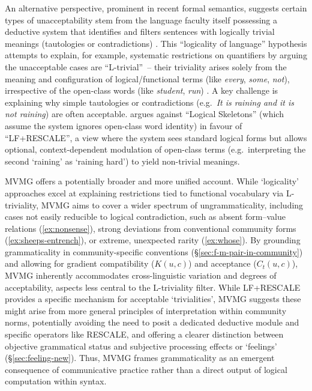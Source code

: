 \documentclass[12pt,letterpaper]{article}
\newcommand{\mention}[1]{\textit{#1}}
\begin{document}
An alternative perspective, prominent in recent formal semantics, suggests certain types of unacceptability stem from the language faculty itself possessing a deductive system that identifies and filters sentences with logically trivial meanings (tautologies or contradictions) \autocite[cf.][]{del_pinal_logicality_2019, chierchia_logic_2013, fox_economy_2000}. This \enquote{logicality of language} hypothesis attempts to explain, for example, systematic restrictions on quantifiers by arguing the unacceptable cases are \enquote{L-trivial}~--  their triviality arises solely from the meaning and configuration of logical/functional terms (like \mention{every}, \mention{some}, \mention{not}), irrespective of the open-class words (like \mention{student}, \mention{run}) \autocite{gajewski_l-triviality_2009}. A key challenge is explaining why simple tautologies or contradictions (e.g.\, \mention{It is raining and it is not raining}) are often acceptable. \textcite{del_pinal_logicality_2019} argues against \enquote{Logical Skeletons} (which assume the system ignores open-class word identity) in favour of \enquote{LF+RESCALE}, a view where the system sees standard logical forms but allows optional, context-dependent modulation of open-class terms (e.g.\, interpreting the second `raining' as `raining hard') to yield non-trivial meanings.

MVMG offers a potentially broader and more unified account. While `logicality' approaches excel at explaining restrictions tied to functional vocabulary via L-triviality, MVMG aims to cover a wider spectrum of ungrammaticality, including cases not easily reducible to logical contradiction, such as absent form--value relations (\ref{ex:nonsense}), strong deviations from conventional community forms (\ref{ex:sheeps-entrench}), or extreme, unexpected rarity (\ref{ex:whose}). By grounding grammaticality in community-specific conventions (\S\ref{sec:f-m-pair-in-community}) and allowing for gradient compatibility ($K(u,c)$) and acceptance ($C_t(u,c)$), MVMG inherently accommodates cross-linguistic variation and degrees of acceptability, aspects less central to the L-triviality filter. While LF+RESCALE provides a specific mechanism for acceptable `trivialities', MVMG suggests these might arise from more general principles of interpretation within community norms, potentially avoiding the need to posit a dedicated deductive module and specific operators like RESCALE, and offering a clearer distinction between objective grammatical status and subjective processing effects or `feelings' (§\ref{sec:feeling-new}). Thus, MVMG frames grammaticality as an emergent consequence of communicative practice rather than a direct output of logical computation within syntax.
\end{document}
